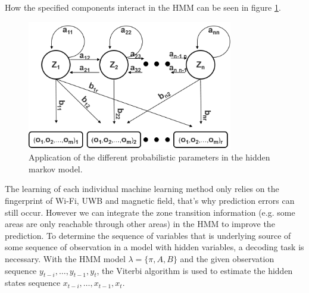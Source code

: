 How the specified components interact in the HMM can be seen in figure \ref{fig:hidden_markov_model}.


\begin{figure}[th]
\centering
\includegraphics[width=0.8\textwidth]{Figures/hidden_markov_model}
\decoRule
\caption[HMM]{Application of the different probabilistic parameters in the hidden markov model.}
\label{fig:hidden_markov_model}
\end{figure}

The learning of each individual machine learning method only relies on the fingerprint of Wi-Fi, UWB and magnetic field, that's why prediction errors can still occur. However we can integrate the zone transition information (e.g. some areas are only reachable through other areas) in the HMM to improve the prediction. To determine the sequence of variables that is underlying source of some sequence of observation in a model with hidden variables, a decoding task is necessary. With the HMM model $\lambda = \{\pi, A, B\}$ and the given observation sequence $y_{t-i},\dots, y_{t-1},y_{t}$, the Viterbi algorithm \cite{Viterbi} is used to estimate the hidden states sequence $x_{t-i},\dots,x_{t-1},x_{t}$.

